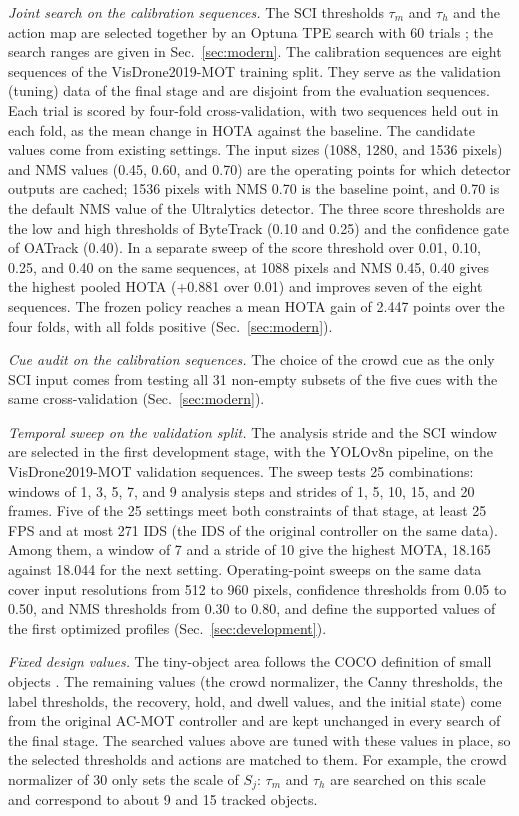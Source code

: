 \documentclass[journal]{new-aiaa}
\begin{document}
\emph{Joint search on the calibration sequences.} The SCI thresholds $\tau_m$
and $\tau_h$ and the action map are selected together by an Optuna TPE search
with 60 trials \cite{akiba2019optuna}; the search ranges are given in
Sec.~\ref{sec:modern}. The calibration sequences are eight
sequences of the VisDrone2019-MOT training split. They serve as the validation
(tuning) data of the final stage and are disjoint from the evaluation
sequences. Each trial is scored by four-fold cross-validation, with two
sequences held out in each fold, as the mean change in HOTA against the
baseline. The candidate values come from existing settings. The input sizes
(1088, 1280, and 1536 pixels) and NMS values (0.45, 0.60, and 0.70) are the
operating points for which detector outputs are cached; 1536 pixels
with NMS 0.70 is the baseline point, and 0.70 is the default NMS value of the
Ultralytics detector. The three score thresholds are the low and high
thresholds of ByteTrack (0.10 and 0.25) and the confidence gate of OATrack
(0.40). In a separate sweep of the score threshold over 0.01, 0.10, 0.25, and
0.40 on the same sequences, at 1088 pixels and NMS 0.45, 0.40 gives the highest
pooled HOTA (+0.881 over 0.01) and improves seven of the eight sequences. The frozen policy reaches a mean HOTA
gain of 2.447 points over the four folds, with all folds positive
(Sec.~\ref{sec:modern}).

\emph{Cue audit on the calibration sequences.} The choice of the crowd cue as
the only SCI input comes from testing all 31 non-empty subsets of the five
cues with the same cross-validation (Sec.~\ref{sec:modern}).

\emph{Temporal sweep on the validation split.} The analysis stride and the
SCI window are selected in the first development stage, with the YOLOv8n
pipeline, on the VisDrone2019-MOT validation sequences. The sweep tests 25
combinations: windows of 1, 3, 5, 7, and 9 analysis steps and strides of 1, 5,
10, 15, and 20 frames. Five of the 25 settings meet both constraints of that
stage, at least 25 FPS and at most 271 IDS (the IDS of the original controller
on the same data). Among them, a window of 7 and a stride of 10 give the
highest MOTA, 18.165 against 18.044 for the next setting. Operating-point
sweeps on the same data cover input resolutions from 512 to 960 pixels,
confidence thresholds from 0.05 to 0.50, and NMS thresholds from 0.30 to 0.80,
and define the supported values of the first optimized profiles
(Sec.~\ref{sec:development}).

\emph{Fixed design values.} The tiny-object area follows the COCO definition
of small objects \cite{lin2014coco}. The remaining values (the crowd
normalizer, the Canny thresholds, the label thresholds, the recovery, hold,
and dwell values, and the initial state) come from the original AC-MOT
controller and are kept unchanged in every search of the final stage. The
searched values above
are tuned with these values in place, so the selected thresholds and actions
are matched to them. For example, the crowd normalizer of 30 only sets the
scale of $S_j$: $\tau_m$ and $\tau_h$ are searched on this scale and
correspond to about 9 and 15 tracked objects.
\end{document}
